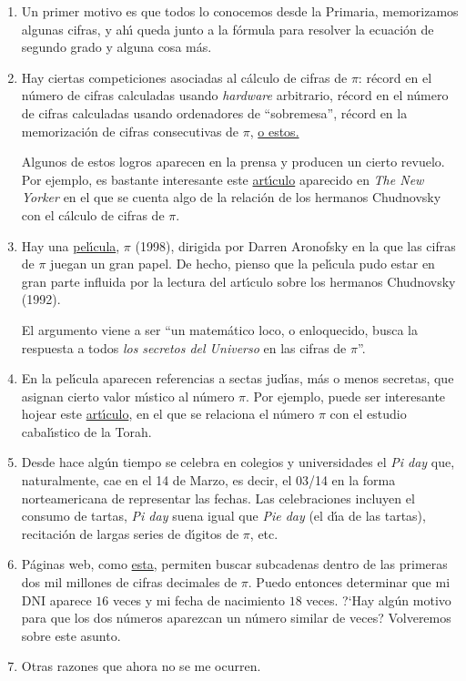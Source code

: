 \begin{enumerate}
 \item Un primer motivo es que todos lo conocemos desde la Primaria, memorizamos
algunas 
cifras, y ah\'{\i} queda junto a la f\'ormula para resolver la ecuaci\'on de
segundo grado y alguna cosa m\'as. 

\item Hay ciertas competiciones asociadas al c\'alculo de cifras de $\pi$:
récord
en el n\'umero de cifras calculadas usando {\itshape hardware} arbitrario,
récord en el n\'umero de cifras calculadas usando ordenadores de ``sobremesa'',
récord en la memorizaci\'on de cifras consecutivas de $\pi$, 
\href{http://recordsetter.com/pi-world-records}{o estos.} 
 
Algunos de estos logros aparecen en la prensa y producen un cierto revuelo. Por
ejemplo, es bastante interesante este 
\href{http://150.244.21.37/PDFs/APROX/newyorker-chudnovsky.pdf}{art\'{\i}culo} aparecido en
{\itshape The New Yorker} en el que se cuenta algo de la relaci\'on de los
hermanos Chudnovsky con el c\'alculo de cifras de $\pi.$

\item Hay una \href{https://en.wikipedia.org/wiki/Pi_(film)}{pel\'{\i}cula}, $\pi$ (1998), 
dirigida por Darren Aronofsky en la que las cifras de $\pi$ juegan un gran
papel. De hecho, pienso que la pel\'{\i}cula pudo estar en gran parte influida
por la lectura del art\'{\i}culo sobre los hermanos Chudnovsky (1992). 

El argumento viene a ser ``un matem\'atico loco, o enloquecido,  busca la
respuesta a todos {\itshape los  secretos del Universo} en las cifras de
$\pi$''. 

\item En la pel\'{\i}cula aparecen referencias a sectas jud\'{\i}as, m\'as o
menos secretas, que asignan cierto valor m\'{\i}stico al n\'umero $\pi$.  Por
ejemplo, puede ser interesante hojear este  
\href{http://150.244.21.37/PDFs/APROX/story-of-pi.pdf}{art\'{\i}culo},  en el que se relaciona
el n\'umero $\pi$ con el estudio cabal\'{\i}stico de la Torah. 
 
 
\item Desde hace alg\'un tiempo se celebra en colegios y universidades el
{\itshape Pi day} que, naturalmente, cae en el 14 de Marzo, es decir, el 03/14
en la forma  norteamericana de representar las fechas.  Las celebraciones
incluyen el consumo de tartas, {\itshape Pi day} suena igual que 
 {\itshape Pie day} (el d\'{\i}a de las tartas), recitaci\'on de largas series
de d\'{\i}gitos de $\pi$, etc.

 \item P\'aginas web, como \href{http://www.subidiom.com/pi/}{esta}, permiten
buscar subcadenas dentro de las primeras dos mil millones de cifras decimales de
$\pi$. Puedo entonces determinar que  mi DNI aparece $16$ veces y mi fecha de
nacimiento  $18$ veces. ?`Hay alg\'un motivo para que los dos n\'umeros
aparezcan un
n\'umero similar de veces? 
 Volveremos sobre este asunto.
 
 \item Otras razones que ahora no se me ocurren.
\end{enumerate}

